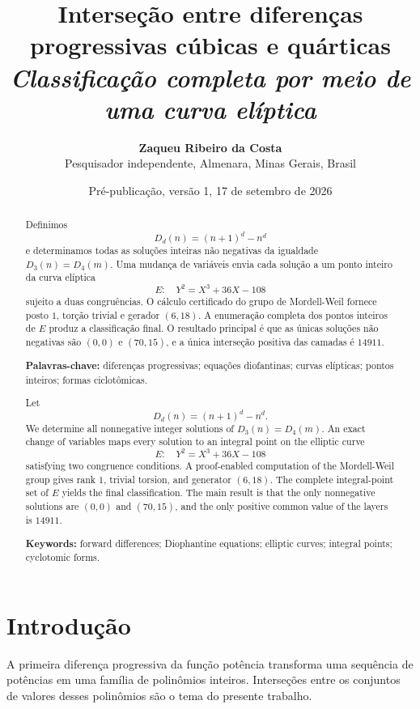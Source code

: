 \documentclass[11pt,letterpaper]{article}
\title{\textbf{Interseção entre diferenças progressivas cúbicas e quárticas}\\[0.45em]
\large\itshape Classificação completa por meio de uma curva elíptica}
\author{\textbf{Zaqueu Ribeiro da Costa}\\
\small Pesquisador independente, Almenara, Minas Gerais, Brasil}
\date{\small Pré-publicação, versão 1, 17 de setembro de 2026}
\theoremstyle{definition}
\newcommand{\Dd}[2]{D_{#1}\!\left(#2\right)}
\begin{document}
\maketitle

\renewcommand{\abstractname}{Resumo}
\begin{abstract}
Definimos
\[
  \Dd{d}{n}=(n+1)^d-n^d
\]
e determinamos todas as soluções inteiras não negativas da igualdade
\(\Dd{3}{n}=\Dd{4}{m}\).
Uma mudança de variáveis envia cada solução a um ponto inteiro da curva elíptica
\[
  E:\quad Y^2=X^3+36X-108
\]
sujeito a duas congruências. O cálculo certificado do grupo de Mordell-Weil fornece posto \(1\), torção trivial e gerador \((6,18)\). A enumeração completa dos pontos inteiros de \(E\) produz a classificação final. O resultado principal é que as únicas soluções não negativas são \((0,0)\) e \((70,15)\), e a única interseção positiva das camadas é \(14911\).

\medskip
\noindent\textbf{Palavras-chave:} diferenças progressivas; equações diofantinas; curvas elípticas; pontos inteiros; formas ciclotômicas.
\end{abstract}

\renewcommand{\abstractname}{Abstract}
\begin{abstract}
Let
\[
  \Dd{d}{n}=(n+1)^d-n^d.
\]
We determine all nonnegative integer solutions of
\(\Dd{3}{n}=\Dd{4}{m}\).
An exact change of variables maps every solution to an integral point on the elliptic curve
\[
  E:\quad Y^2=X^3+36X-108
\]
satisfying two congruence conditions. A proof-enabled computation of the Mordell-Weil group gives rank \(1\), trivial torsion, and generator \((6,18)\). The complete integral-point set of \(E\) yields the final classification. The main result is that the only nonnegative solutions are \((0,0)\) and \((70,15)\), and the only positive common value of the layers is \(14911\).

\medskip
\noindent\textbf{Keywords:} forward differences; Diophantine equations; elliptic curves; integral points; cyclotomic forms.
\end{abstract}

\section{Introdução}

A primeira diferença progressiva da função potência transforma uma sequência de potências em uma família de polinômios inteiros. Interseções entre os conjuntos de valores desses polinômios são o tema do presente trabalho.
\end{document}
